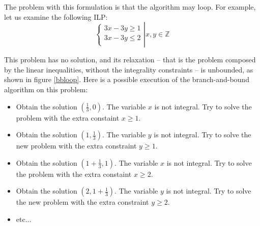 \documentclass{article}
\newcommand{\cunsat}{\texttt{Unsatisfiable}}
\newcommand{\ints}{\mathbb{Z}}
\begin{document}
%

The problem with this formulation is that the algorithm may loop. For example,
let us examine the following ILP:
\begin{equation} \label{pbloop}
  \left\{
  \begin{array}{l}
    3x - 3y \geqslant 1 \\
    3x - 3y \leqslant 2 \\
  \end{array}
  \right|
  x, y \in \ints
\end{equation}

This problem has no solution, and its relaxation -- that is the problem
composed by the linear inequalities, without the integrality constraints -- is
unbounded, as shown in figure \ref{bbloop}. Here is a possible execution of the
branch-and-bound algorithm on this problem:
\begin{itemize}
  \item Obtain the solution $(\frac{1}{3}, 0)$. The variable $x$ is not
    integral. Try to solve the problem with the extra constaint
    $x \geqslant 1$.
  \item Obtain the solution $(1, \frac{1}{3})$. The variable $y$ is not
    integral. Try to solve the new problem with the extra constraint $y
    \geqslant 1$.
  \item Obtain the solution $(1 + \frac{1}{3}, 1)$. The variable $x$ is not
    integral. Try to solve the problem with the extra constaint
    $x \geqslant 2$.
  \item Obtain the solution $(2, 1 + \frac{1}{3})$. The variable $y$ is not
    integral. Try to solve the new problem with the extra constraint $y
    \geqslant 2$.
  \item etc...
\end{itemize}
\end{document}
